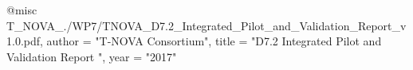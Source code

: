 @misc{ T_NOVA_./WP7/TNOVA_D7.2_Integrated_Pilot_and_Validation_Report_v1.0.pdf,
       author = "T-NOVA Consortium",
       title = "D7.2 Integrated Pilot and Validation Report ",
       year = "2017" }
